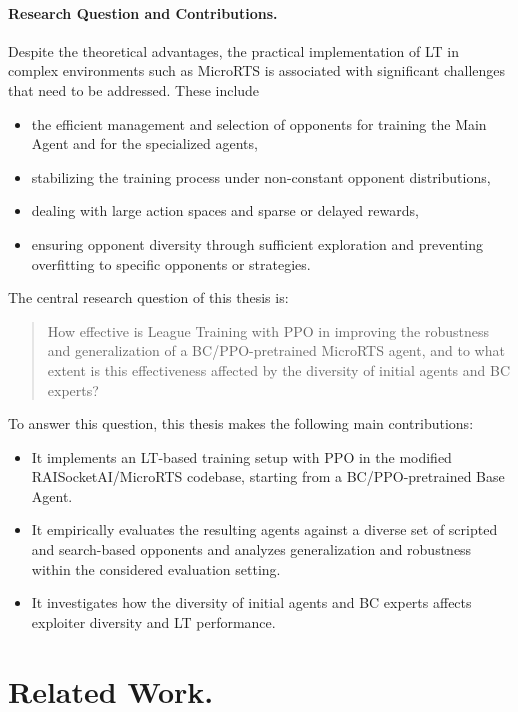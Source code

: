 \documentclass[10pt,twocolumn,letterpaper]{article}
\begin{document}
\paragraph{Research Question and Contributions.}
Despite the theoretical advantages, the practical implementation of LT in complex environments such as MicroRTS is associated with significant challenges that need to be addressed. 
These include
\begin{itemize}
    \item the efficient management and selection of opponents for training the Main Agent and for the specialized agents,
    \item stabilizing the training process under non-constant opponent distributions,
    \item dealing with large action spaces and sparse or delayed rewards,
    \item ensuring opponent diversity through sufficient exploration and preventing overfitting to specific opponents or strategies.
\end{itemize}
The central research question of this thesis is:
\begin{quote}
How effective is League Training with PPO in improving the robustness and generalization of a BC/PPO-pretrained MicroRTS agent, and to what extent is this effectiveness affected by the diversity of initial agents and BC experts?
\end{quote}
To answer this question, this thesis makes the following main contributions:
\begin{itemize}
    \item It implements an LT-based training setup with PPO in the modified RAISocketAI/MicroRTS codebase, starting from a BC/PPO-pretrained Base Agent.
    \item It empirically evaluates the resulting agents against a diverse set of scripted and search-based opponents and analyzes generalization and robustness within the considered evaluation setting.
    \item It investigates how the diversity of initial agents and BC experts affects exploiter diversity and LT performance.
\end{itemize}



\section{Related Work.}
\label{sec:related-work}
\end{document}
